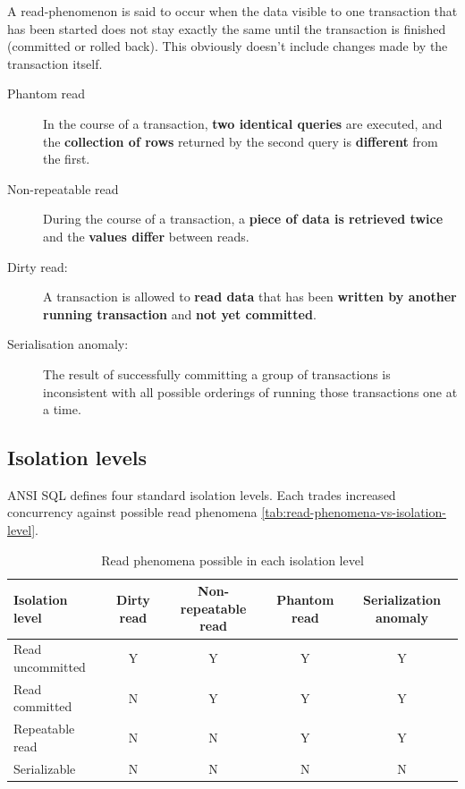\documentclass[slides]{pgnotes}
\begin{document}
A read-phenomenon is said to occur when the data visible to one transaction that has been started does not stay exactly the same until the transaction is finished (committed or rolled back). 
This obviously doesn't include changes made by the transaction itself.

\begin{description}
\item[Phantom read] In the course of a transaction, \textbf{two identical queries} are executed, and the \textbf{collection of rows} returned by the second query is \textbf{different} from the first.
\item[Non-repeatable read] During the course of a transaction, a \textbf{piece of data is retrieved twice} and the \textbf{values differ} between reads.
\item[Dirty read:] A transaction is allowed to \textbf{read data} that has been \textbf{written by another running transaction} and \textbf{not yet committed}.
\item[Serialisation anomaly:] The result of successfully committing a group of transactions is inconsistent with all possible orderings of running those transactions one at a time.
\end{description}
  
\subsection{Isolation levels}

ANSI SQL defines four standard isolation levels.
Each trades increased concurrency against possible read phenomena \autoref{tab:read-phenomena-vs-isolation-level}.

\begin{table}[htbp]
  \centering
  \begin{tabular}{l c c c c}
    \toprule
    \textbf{Isolation level} & \textbf{Dirty read} & \textbf{Non-repeatable read} & \textbf{Phantom read} & \textbf{Serialization anomaly} \\
    \midrule
    Read uncommitted & Y & Y & Y & Y \\
    Read committed & N & Y & Y & Y \\
    Repeatable read & N & N & Y & Y \\
    Serializable & N & N & N & N \\
    \bottomrule
  \end{tabular}
  \caption{Read phenomena possible in each isolation level}
  \label{tab:read-phenomena-vs-isolation-level}
\end{table}
\end{document}
